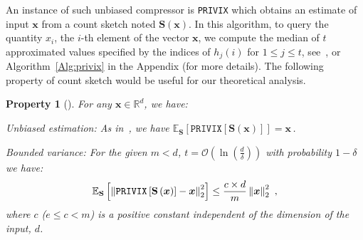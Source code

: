 \documentclass{article} %
\newtheorem{property}{Property}
\begin{document}
An instance of such unbiased compressor is \texttt{PRIVIX} which obtains an estimate of input $\boldsymbol{x}$ from a count sketch noted $\boldsymbol{S}(\boldsymbol{x})$. 
In this algorithm, to query the quantity $x_i$, the $i$-th element of the vector $\boldsymbol{x}$, we compute the median of $t$ approximated values specified by the indices of $h_j(i)$ for $1\leq j\leq t$, see~\citep{li2019privacy}, or Algorithm~\ref{Alg:privix} in the Appendix (for more details).
The following property of count sketch would be useful for our theoretical analysis.
\begin{property}[\cite{li2019privacy}]
For any $\boldsymbol{x}\in \mathbb{R}^{d}$, we have:

\textit{Unbiased estimation}: As in~\cite{li2019privacy}, we have $ \mathbb{E}_{\mathbf{S}}\left[\texttt{PRIVIX}\left[\mathbf{S}\left(\boldsymbol{x}\right)\right]\right]=\boldsymbol{x}\, $.

\textit{Bounded variance:} For the given $m<d$, $t=\mathcal{O}\left(\ln \left(\frac{d}{\delta}\right)\right)$ with probability $1-\delta$ we have:
    \begin{align}\notag
        \mathbb{E}_{\mathbf{S}}\left[\left\|\texttt{PRIVIX}\left[\mathbf{S}\left(\boldsymbol{x}\right)\right]-\boldsymbol{x}\right\|_2^2\right] \leq \frac{c\times d}{m}\left\|\boldsymbol{x}\right\|_2^2\ , 
    \end{align}
 where $c$ ($e\leq c<m$) is a positive constant independent of the dimension of the input, $d$.
\end{property}
\end{document}
